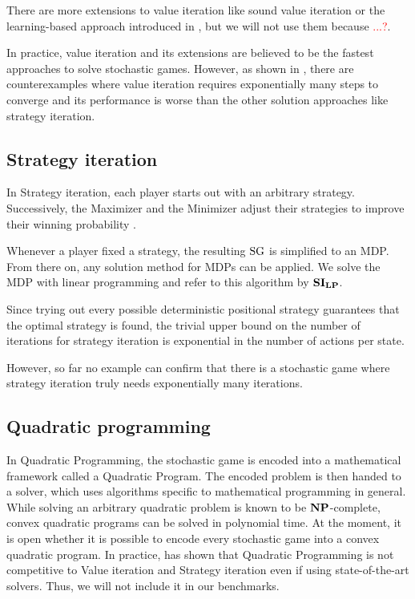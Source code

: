 There are more extensions to value iteration like sound value iteration \cite{Cite?} or the learning-based approach introduced in \cite{???},
but we will not use them because \textcolor{red}{...?}.

In practice, value iteration and its extensions are believed to be the fastest approaches to solve stochastic games.
However, as shown in \cite{haddadmonmege}, there are counterexamples where value iteration requires exponentially many steps to converge and its performance is worse than the other solution approaches like strategy iteration.

\subsection{Strategy iteration}
In Strategy iteration, each player starts out with an arbitrary strategy.
Successively, the Maximizer and the Minimizer adjust their strategies to 
improve their winning probability \cite{condonQP}.

Whenever a player fixed a strategy, the resulting $\textrm{SG}$ is simplified to an MDP. 
From there on, any solution method for MDPs can be applied.
We solve the MDP with linear programming \cite{Citation to any LP-solving explanation for MDPs. Maybe Puterman?} and refer to this algorithm by $\mathbf{SI_{LP}}$.

Since trying out every possible deterministic positional strategy guarantees that the optimal strategy is found,
the trivial upper bound on the number of iterations for strategy iteration is exponential in the number of actions per state.

However, so far no example can confirm that there is a stochastic game where strategy iteration truly needs exponentially many iterations.

\subsection{Quadratic programming}
In Quadratic Programming, the stochastic game is encoded into a mathematical framework called a Quadratic Program. 
The encoded problem is then handed to a solver, which uses algorithms specific to mathematical programming in general.
While solving an arbitrary quadratic problem is known to be $\mathbf{NP}$-complete, convex quadratic programs can be solved in polynomial time.
At the moment, it is open whether it is possible to encode every stochastic game into a convex quadratic program.
In practice, \cite{Gandalf} has shown that Quadratic Programming is not competitive to Value iteration and Strategy iteration even if using 
state-of-the-art solvers. Thus, we will not include it in our benchmarks.

